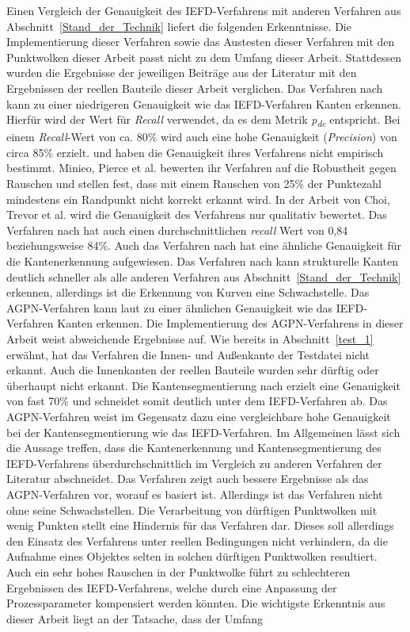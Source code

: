 Einen Vergleich der Genauigkeit des IEFD-Verfahrens mit anderen Verfahren aus Abschnitt~\ref{Stand_der_Technik} liefert die folgenden Erkenntnisse. Die Implementierung dieser Verfahren sowie das Austesten dieser Verfahren mit den Punktwolken dieser Arbeit passt nicht zu dem Umfang dieser Arbeit. Stattdessen wurden die Ergebnisse der jeweiligen Beiträge aus der Literatur mit den Ergebnissen der reellen Bauteile dieser Arbeit verglichen. Das Verfahren nach \textcite[7353]{ahmed_edge_2018} kann zu einer niedrigeren Genauigkeit wie das IEFD-Verfahren Kanten erkennen. Hierfür wird der Wert für \textit{Recall} verwendet, da es dem Metrik \textit{p\textsubscript{dc}} entspricht. Bei einem \textit{Recall}-Wert von ca. 80\% wird auch eine hohe Genauigkeit (\textit{Precision}) von circa 85\% erzielt. \textcite[88]{mineo_novel_2019} und \textcite{choi_rgb-d_2013} haben die Genauigkeit ihres Verfahrens nicht empirisch bestimmt. Minieo, Pierce et al. bewerten ihr Verfahren auf die Robustheit gegen Rauschen und stellen fest, dass mit einem Rauschen von 25\% der Punktezahl mindestens ein Randpunkt nicht korrekt erkannt wird. In der Arbeit von Choi, Trevor et al. wird die Genauigkeit des Verfahrens nur qualitativ bewertet. Das Verfahren nach \textcite[11]{bazazian_edc-net_2021} hat auch einen durchschnittlichen \textit{recall} Wert von 0,84 beziehungsweise 84\%. Auch das Verfahren nach \textcite[9]{himeur_pcednet_2021} hat eine ähnliche Genauigkeit für die Kantenerkennung aufgewiesen. Das Verfahren nach \textcite{lu_fast_2019} kann strukturelle Kanten deutlich schneller als alle anderen Verfahren aus Abschnitt~\ref{Stand_der_Technik} erkennen, allerdings ist die Erkennung von Kurven eine Schwachstelle. Das AGPN-Verfahren kann laut \textcite{ni_edge_2016} zu einer ähnlichen Genauigkeit wie das IEFD-Verfahren Kanten erkennen. Die Implementierung des AGPN-Verfahrens in dieser Arbeit weist abweichende Ergebnisse auf. Wie bereits in Abschnitt~\ref{test_1} erwähnt, hat das Verfahren die Innen- und Außenkante der Testdatei nicht erkannt. Auch die Innenkanten der reellen Bauteile wurden sehr dürftig oder überhaupt nicht erkannt. Die Kantensegmentierung nach \textcite[234]{hu_jsenet_2020} erzielt eine Genauigkeit von fast 70\% und schneidet somit deutlich unter dem IEFD-Verfahren ab. Das AGPN-Verfahren weist im Gegensatz dazu eine vergleichbare hohe Genauigkeit bei der Kantensegmentierung wie das IEFD-Verfahren. Im Allgemeinen lässt sich die Aussage treffen, dass die Kantenerkennung und Kantensegmentierung des IEFD-Verfahrens überdurchschnittlich im Vergleich zu anderen Verfahren der Literatur abschneidet. Das Verfahren zeigt auch bessere Ergebnisse als das AGPN-Verfahren vor, worauf es basiert ist. Allerdings ist das Verfahren nicht ohne seine Schwachstellen. Die Verarbeitung von dürftigen Punktwolken mit wenig Punkten stellt eine Hindernis für das Verfahren dar. Dieses soll allerdings den Einsatz des Verfahrens unter reellen Bedingungen nicht verhindern, da die Aufnahme eines Objektes selten in solchen dürftigen Punktwolken resultiert. Auch ein sehr hohes Rauschen in der Punktwolke führt zu schlechteren Ergebnissen des IEFD-Verfahrens, welche durch eine Anpassung der Prozessparameter kompensiert werden könnten. Die wichtigste Erkenntnis aus dieser Arbeit liegt an der Tatsache, dass der Umfang 